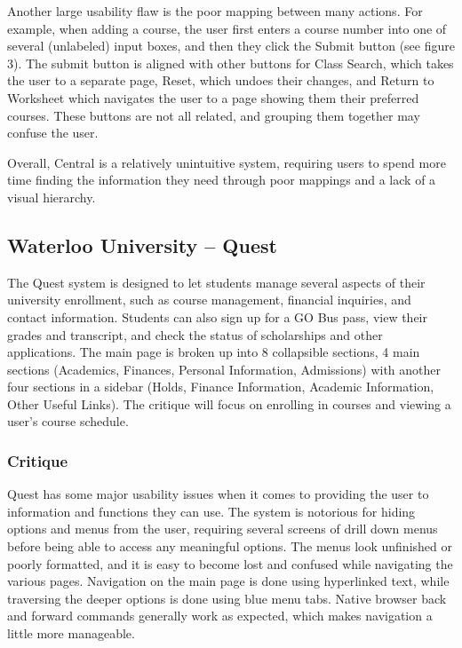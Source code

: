 \documentclass[10pt]{article}
\newenvironment{InlineColumnFigure}
{\par\medskip\noindent\minipage{\linewidth}}
{\endminipage\par\medskip}
\newcommand{\Caption}[1]
{\vspace{-4mm}\fontsize{9}{9}\textbf{Figure \refstepcounter{figCounter} 
\arabic{figCounter}: #1}}
\newcounter{figCounter}
\begin{document}
\begin{multicols}{2}
Another large usability flaw is the poor mapping between many actions. For 
example, when adding a course, the user first enters a course number into one of 
several (unlabeled) input boxes, and then they click the Submit button (see 
figure 3). The submit button is aligned with other buttons for Class Search, 
which takes the user to a separate page, Reset, which undoes their changes, and 
Return to Worksheet which navigates the user to a page showing them their 
preferred courses. These buttons are not all related, and grouping them together 
may confuse the user.

Overall, Central is a relatively unintuitive system, requiring users to spend 
more time finding the information they need through poor mappings and a lack of 
a visual hierarchy.

\subsection*{Waterloo University -- Quest}
The Quest system is designed to let students manage several aspects 
of their university enrollment, such as course management, financial inquiries, 
and contact information. Students can also sign up for a GO Bus pass, view their 
grades and transcript, and check the status of scholarships and other 
applications. The main page is broken up into 8 collapsible sections, 4 main 
sections (Academics, Finances, Personal Information, Admissions) with another four 
sections in a sidebar (Holds, Finance Information, Academic Information, Other 
Useful Links). The critique will focus on enrolling in courses and viewing a 
user's course schedule. 


\subsubsection*{Critique}
Quest has some major usability issues when it comes to providing the user to 
information and functions they can use. The system is notorious for hiding 
options and menus from the user, requiring several screens of drill down menus 
before being able to access any meaningful options. The menus look unfinished or 
poorly formatted, and it is easy to become lost and confused while navigating 
the various pages. Navigation on the main page is done using hyperlinked text, 
while traversing the deeper options is done using blue menu tabs. Native browser 
back and forward commands generally work as expected, which makes navigation a 
little more manageable. 


\end{multicols}
\end{document}

